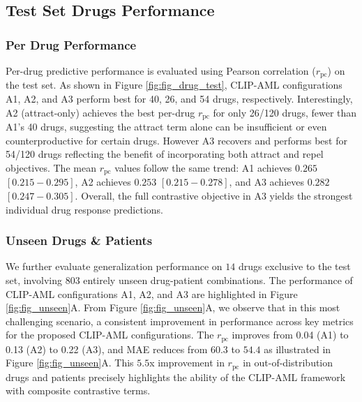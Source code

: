 \documentclass[sigconf,authordraft]{acmart}
\begin{document}
\subsection{Test Set Drugs Performance}
\subsubsection{Per Drug Performance}
Per-drug predictive performance is evaluated using Pearson correlation ($r_{\text{pc}}$) on the test set. %
As shown in Figure \ref{fig:fig_drug_test}, CLIP-AML configurations A1, A2, and A3 perform best for 40, 26, and 54 drugs, respectively. Interestingly, A2 (attract-only) achieves the best per-drug $r_{\text{pc}}$ for only 26/120 drugs, fewer than A1's 40 drugs, suggesting the attract term alone can be insufficient or even counterproductive for certain drugs. However A3 recovers and performs best for 54/120 drugs reflecting the benefit of incorporating both attract and repel objectives. The mean $r_{\text{pc}}$ values follow the same trend: A1 achieves $0.265$ $[0.215-0.295]$, A2 achieves $0.253$ $[0.215-0.278]$, and A3 achieves $0.282$ $[0.247-0.305]$. Overall, the full contrastive objective in A3 yields the strongest individual drug response predictions.
\subsubsection{Unseen Drugs \& Patients}
We further evaluate generalization performance on $14$ drugs exclusive to the test set, involving $803$ entirely unseen drug-patient combinations. The performance of CLIP-AML configurations A1, A2, and A3 are highlighted in Figure \ref{fig:fig_unseen}A. From Figure \ref{fig:fig_unseen}A, we observe that in this most challenging scenario, a consistent improvement in performance across key metrics for the proposed CLIP-AML configurations. The $r_{\text{pc}}$ improves from 0.04 (A1) to 0.13 (A2) to 0.22 (A3), and MAE reduces from $60.3$ to $54.4$ as illustrated in Figure \ref{fig:fig_unseen}A. This $5.5$x improvement in $r_{\text{pc}}$ in out-of-distribution drugs and patients precisely highlights the ability of the CLIP-AML framework with composite contrastive terms.
\end{document}
